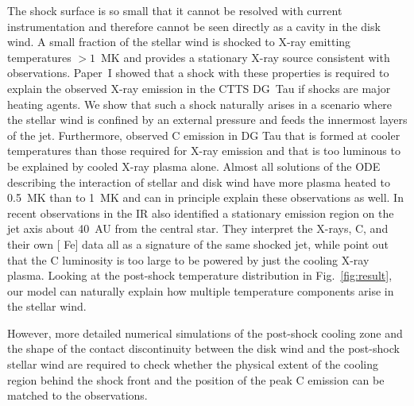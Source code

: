 \documentclass[manuscript]{aastex}
\begin{document}
The shock surface is so small that it cannot be resolved with current instrumentation and therefore cannot be seen directly as a cavity in the disk wind. A small fraction of the stellar wind is shocked to X-ray emitting temperatures $>1$~MK and provides a stationary X-ray source consistent with observations. 
Paper~I showed that a shock with these properties is required to explain the observed X-ray emission in the CTTS DG~Tau if shocks are major heating agents. We show that such a shock naturally arises in a scenario where the stellar wind is confined by an external pressure and feeds the innermost layers of the jet.
Furthermore, \citet{2013A&A...550L...1S} observed C emission in DG Tau that is formed at cooler temperatures than those required for X-ray emission and that is too luminous to be explained by cooled X-ray plasma alone. Almost all solutions of the ODE describing the interaction of stellar and disk wind have more plasma heated to 0.5~MK than to 1~MK and can in principle explain these observations as well. In recent observations in the IR \citet{2014arXiv1404.0728W} also identified a stationary emission region on the jet axis about 40~AU from the central star. They interpret the X-rays,  C, and their own [ Fe] data all as a signature of the same shocked jet, while \citet{2013A&A...550L...1S} point out that the C luminosity is too large to be powered by just the cooling X-ray plasma. Looking at the post-shock temperature distribution in Fig.~\ref{fig:result}, our model can naturally explain how multiple temperature components arise in the stellar wind.

However, more detailed numerical simulations of the post-shock cooling zone and the shape of the contact discontinuity between the disk wind and the post-shock stellar wind are required to check whether the physical extent of the cooling region behind the shock front and the position of the peak  C emission can be matched to the observations.
\end{document}

